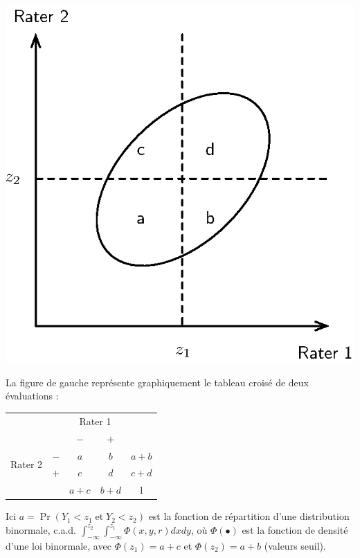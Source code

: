 \begin{minipage}{0.45\textwidth}
\centerline{\includegraphics[scale=.85]{./figs/tetrachoric.eps}}
\end{minipage}\hfill
\begin{minipage}{0.5\textwidth}
	\small
La figure de gauche représente graphiquement le tableau croisé de deux
évaluations :
\vspace*{.5cm}

\begin{tabular}{lc|c|c|c}
& \multicolumn{1}{c}{} &	\multicolumn{2}{c}{Rater 1} & \\
& \multicolumn{1}{c}{} & \multicolumn{1}{c}{$-$} & \multicolumn{1}{c}{$+$} & \\
\cline{3-4}
\multirow{2}{*}{Rater 2} & $-$ & $a$ & $b$ & $a+b$ \\
\cline{3-4}
& $+$ & $c$ & $d$ & $c+d$ \\
\cline{3-4}
& \multicolumn{1}{c}{} & \multicolumn{1}{c}{$a+c$} & \multicolumn{1}{c}{$b+d$} & 1 \\
\end{tabular}
\end{minipage}

Ici $a=\Pr(Y_1<z_1\;\text{et}\;Y_2<z_2)$ est la fonction de répartition d'une
distribution binormale, c.a.d. $\displaystyle
\int_{-\infty}^{z_2}\int_{-\infty}^{z_1}\Phi(x,y,r)dxdy$, où $\Phi(\bullet)$ est
la fonction de densité d'une loi binormale, avec $\Phi(z_1) = a+c$ et $\Phi(z_2)
= a+b$ (valeurs seuil).


